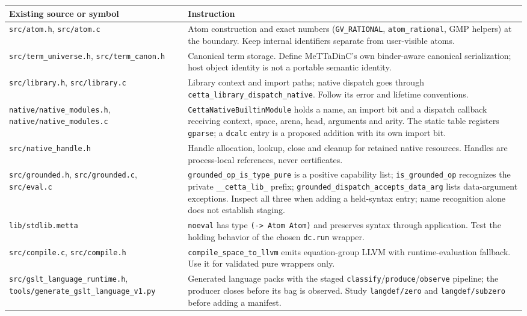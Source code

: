 \documentclass[11pt]{article}
\newcommand{\fpath}[1]{\nolinkurl{#1}}
\newcommand{\code}[1]{\texttt{#1}}
\begin{document}
\begin{longtable}{>{\raggedright\arraybackslash}p{4.6cm}>{\raggedright\arraybackslash}p{9.3cm}}
\toprule
Existing source or symbol & Instruction\\
\midrule
\endhead
\fpath{src/atom.h}, \fpath{src/atom.c} & Atom construction and exact numbers (\fpath{GV_RATIONAL}, \fpath{atom_rational}, GMP helpers) at the boundary. Keep internal identifiers separate from user-visible atoms.\\
\fpath{src/term_universe.h}, \fpath{src/term_canon.h} & Canonical term storage. Define MeTTaDinC's own binder-aware canonical serialization; host object identity is not a portable semantic identity.\\
\fpath{src/library.h}, \fpath{src/library.c} & Library context and import paths; native dispatch goes through \fpath{cetta_library_dispatch_native}. Follow its error and lifetime conventions.\\
\fpath{native/native_modules.h}, \fpath{native/native_modules.c} & \code{CettaNativeBuiltinModule} holds a name, an import bit and a dispatch callback receiving context, space, arena, head, arguments and arity. The static table registers \code{gparse}; a \code{dcalc} entry is a proposed addition with its own import bit.\\
\fpath{src/native_handle.h} & Handle allocation, lookup, close and cleanup for retained native resources. Handles are process-local references, never certificates.\\
\fpath{src/grounded.h}, \fpath{src/grounded.c}, \fpath{src/eval.c} & \fpath{grounded_op_is_type_pure} is a positive capability list; \fpath{is_grounded_op} recognizes the private \fpath{__cetta_lib_} prefix; \fpath{grounded_dispatch_accepts_data_arg} lists data-argument exceptions. Inspect all three when adding a held-syntax entry; name recognition alone does not establish staging.\\
\fpath{lib/stdlib.metta} & \code{noeval} has type \code{(-> Atom Atom)} and preserves syntax through application. Test the holding behavior of the chosen \code{dc.run} wrapper.\\
\fpath{src/compile.c}, \fpath{src/compile.h} & \fpath{compile_space_to_llvm} emits equation-group LLVM with runtime-evaluation fallback. Use it for validated pure wrappers only.\\
\fpath{src/gslt_language_runtime.h}, \fpath{tools/generate_gslt_language_v1.py} & Generated language packs with the staged \code{classify}/\code{produce}/\code{observe} pipeline; the producer closes before its bag is observed. Study \fpath{langdef/zero} and \fpath{langdef/subzero} before adding a manifest.\\

\end{longtable}
\end{document}
